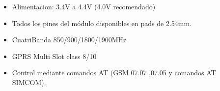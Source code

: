 \begin{itemize}
 \item Alimentacion: 3.4V a 4.4V (4.0V recomendado)
 \item  Todos los pines del módulo disponibles en pads de 2.54mm.
 \item  CuatriBanda 850/900/1800/1900MHz
 \item  GPRS Multi Slot class 8/10
 \item  Control mediante comandos AT (GSM 07.07 ,07.05 y comandos AT SIMCOM).
\end{itemize}

%
%
%	
%
%
%
%
%
%
%	
%		
%
%		
%		
%		
%		
%


